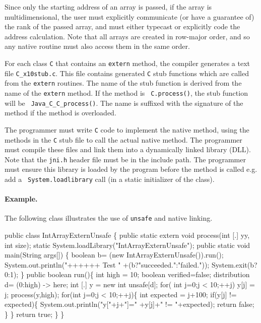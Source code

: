 Since only the starting address of an array is passed, if the array is
multidimensional, the user must explicitly communicate (or have a
guarantee of) the rank of the passed array, and must either typecast
or explicitly code the address calculation.  Note that all \Xten{}
arrays are created in row-major order, and so any native routine must
also access them in the same order.

For each class {\tt C} that contains an {\tt extern} method, the
\Xten{} compiler generates a text file {\tt C\_x10stub.c}.  This file
contains generated {\tt C} stub functions which are called from the
{\tt extern} routines.  The name of the stub function is derived from
the name of the {\tt extern} method. If the method is {\tt
C.process()}, the stub function will be {\tt
Java\_C\_C\_process()}. The name is suffixed with the signature of the
method if the method is overloaded.

The programmer must write {\tt C} code to implement the native method,
using the methods in the {\tt C} stub file to call the actual native
method.  The programmer must compile these files and link them into a
dynamically linked library (DLL).  Note that the {\tt jni.h} header file
must be in the include path.  The programmer must ensure this library
is loaded by the program before the method is called e.g.{} add a {\tt
System.loadlibrary} call (in a static initializer of the
\Xten{} class).

\paragraph{Example.}
The following class illustrates the use of {\tt unsafe} and native
linking. 
\begin{x10}
public class IntArrayExternUnsafe \{
  public static extern 
      void process(int [.] yy, int size);
  static {System.loadLibrary("IntArrayExternUnsafe");}
  public static void main(String args[]) \{
     boolean b= (new IntArrayExternUnsafe()).run();
     System.out.println("++++++ Test "
                         +(b?"succeeded.":"failed."));
     System.exit(b?0:1);
  \}
  public boolean run()\{
    int high = 10;
    boolean verified=false;
    distribution d= (0:high) -> here;
    int [.] y = new int unsafe[d]; 
    for( int j=0;j < 10;++j)
        y[j] = j;
    process(y,high);
    for(int j=0;j < 10;++j)\{
      int expected = j+100;
      if(y[j] != expected)\{
        System.out.println("y["+j+"]="
                           +y[j]+" != "+expected);
        return false;
       \}
    \}
    return true;
  \}
\}
\end{x10}

